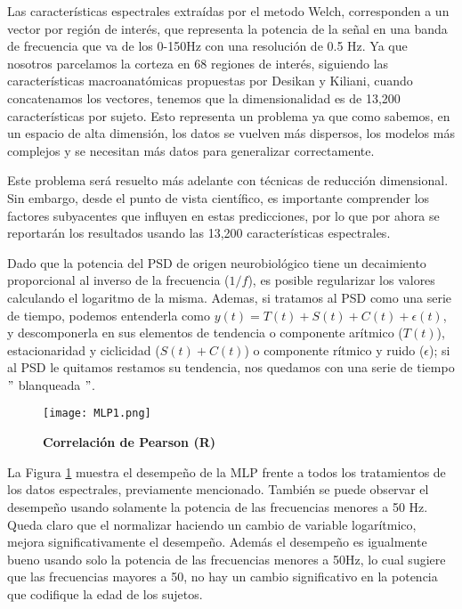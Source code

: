 \documentclass[11pt,letterpaper]{article}
\numberwithin{equation}{subsection}
\numberwithin{table}{subsection}
\begin{document}
\smallskip
\noindent Las características espectrales extraídas por el metodo Welch, corresponden a un vector por región de interés, que representa la potencia de la señal en una banda de frecuencia que va de los 0-150Hz con una resolución de 0.5 Hz. Ya que nosotros parcelamos la corteza en 68 regiones de interés, siguiendo las características macroanatómicas propuestas por Desikan y Kiliani, cuando concatenamos los vectores, tenemos que la dimensionalidad es de 13,200 características por sujeto. Esto representa un problema ya que como sabemos, en un espacio de alta dimensión, los datos se vuelven más dispersos, los modelos más complejos y se necesitan más datos para generalizar correctamente. 

\smallskip
\noindent Este problema será resuelto más adelante con técnicas de reducción dimensional. Sin embargo, desde el punto de vista científico, es importante comprender los factores subyacentes que influyen en estas predicciones, por lo que por ahora se reportarán los resultados usando las 13,200 características espectrales. 

\bigskip
\noindent Dado que la potencia del PSD de origen neurobiológico tiene un decaimiento proporcional al inverso de la frecuencia ($1/f$), es posible regularizar los valores calculando el logaritmo de la misma. Ademas, si tratamos al PSD como una serie de tiempo, podemos entenderla como $y(t)=T(t)+S(t)+C(t)+\epsilon(t)$, y descomponerla en sus elementos de tendencia o componente arítmico ($T(t)$), estacionaridad y ciclicidad ($S(t)+C(t)$) o componente rítmico y ruido ($\epsilon$); si al PSD le quitamos restamos su tendencia, nos quedamos con una serie de tiempo $"$ blanqueada $"$.
   

\bigskip
\begin{figure}[H]
\centering
	\texttt{[image: MLP1.png]}
	\captionsetup{labelfont=bf}
	\caption{\scriptsize \textbf {Correlación de Pearson (R)} }
	\label{fig:Fig18}
\end{figure} 

\bigskip
\noindent La Figura \ref{fig:Fig18} muestra el desempeño de la MLP frente a todos los tratamientos de los datos espectrales, previamente mencionado.  También se puede observar el desempeño usando solamente la potencia de las frecuencias menores a 50 Hz. Queda claro que el normalizar haciendo un cambio de variable logarítmico, mejora significativamente el desempeño. Además el desempeño es igualmente bueno usando solo la potencia de las frecuencias menores a 50Hz, lo cual sugiere que las frecuencias mayores a 50, no hay un cambio significativo en la potencia que codifique la edad de los sujetos.
\end{document}
